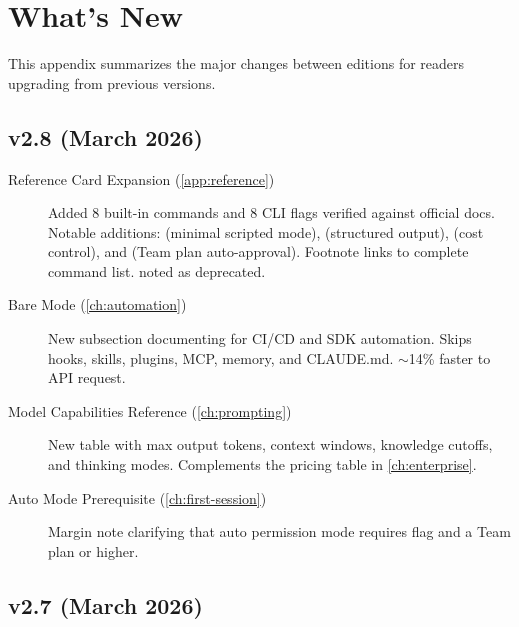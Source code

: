 \chapter{What's New}
\label{app:whats-new}

This appendix summarizes the major changes between editions
for readers upgrading from previous versions.

\section*{v2.8 (March 2026)}

\begin{description}
  \item[Reference Card Expansion (\cref{app:reference})]
    Added 8 built-in commands and 8 CLI flags verified against official docs.
    Notable additions:  (minimal scripted mode), 
    (structured output),  (cost control), and
     (Team plan auto-approval).
    Footnote links to complete command list.  noted as deprecated.

  \item[Bare Mode (\cref{ch:automation})]
    New subsection documenting  for CI/CD and SDK automation.
    Skips hooks, skills, plugins, MCP, memory, and CLAUDE.md.
    $\sim$14\% faster to API request.

  \item[Model Capabilities Reference (\cref{ch:prompting})]
    New table with max output tokens, context windows, knowledge cutoffs,
    and thinking modes. Complements the pricing table in \cref{ch:enterprise}.

  \item[Auto Mode Prerequisite (\cref{ch:first-session})]
    Margin note clarifying that auto permission mode requires
     flag and a Team plan or higher.
\end{description}

\section*{v2.7 (March 2026)}

